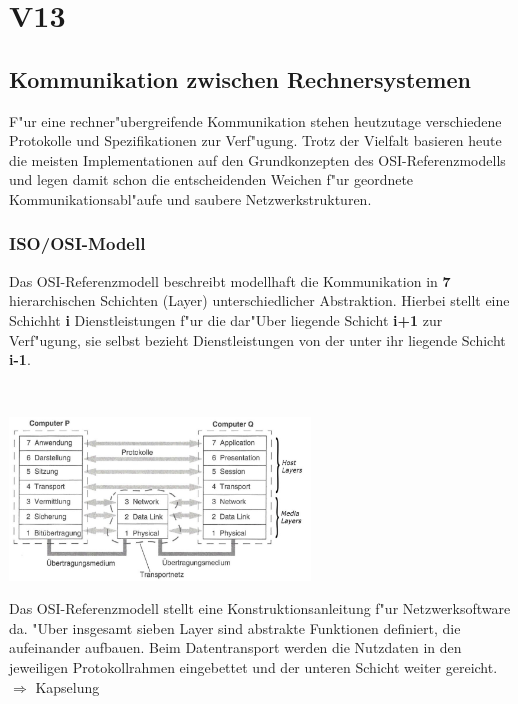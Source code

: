 \section{V13}
\subsection{Kommunikation zwischen Rechnersystemen}
F"ur eine rechner"ubergreifende Kommunikation stehen heutzutage verschiedene Protokolle und Spezifikationen zur Verf"ugung. Trotz der Vielfalt basieren heute die meisten Implementationen auf den Grundkonzepten des OSI-Referenzmodells und legen damit schon die entscheidenden Weichen f"ur geordnete Kommunikationsabl"aufe und saubere Netzwerkstrukturen.

\begin{minipage}{9cm}
\subsubsection{ISO/OSI-Modell}
	Das OSI-Referenzmodell beschreibt modellhaft die Kommunikation in \textbf{7}
 hierarchischen Schichten (Layer) unterschiedlicher Abstraktion. Hierbei stellt eine Schichht \textbf{i} Dienstleistungen f"ur die dar"Uber liegende Schicht \textbf{i+1} zur Verf"ugung, sie selbst bezieht Dienstleistungen von der unter ihr liegende Schicht \textbf{i-1}.
\end{minipage}
%
\begin{minipage}{0.5cm}
	\-\
\end{minipage}
%
\begin{minipage}{9cm}
	\includegraphics[width=8cm]{images/OSI-Referenzmodell}
\end{minipage}

 Das OSI-Referenzmodell stellt eine Konstruktionsanleitung f"ur Netzwerksoftware da. "Uber insgesamt sieben Layer sind abstrakte Funktionen definiert, die aufeinander aufbauen. Beim Datentransport werden die Nutzdaten in den jeweiligen Protokollrahmen eingebettet und der unteren Schicht weiter gereicht. $\Rightarrow$ Kapselung\\

